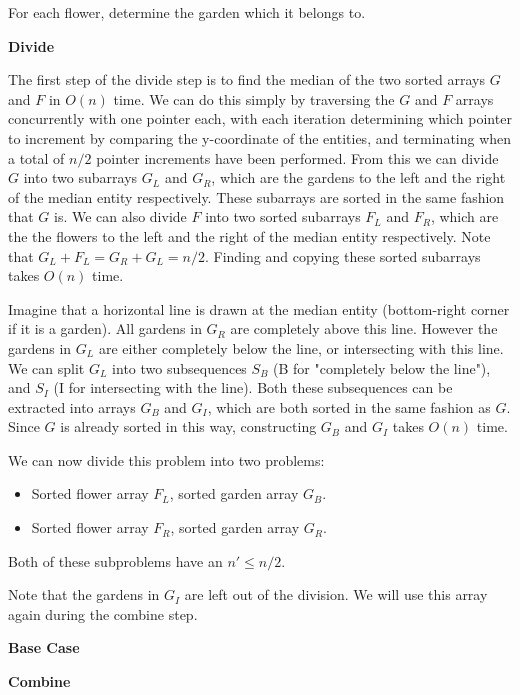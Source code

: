 \documentclass{article}
\begin{document}
\begin{solution}
\begin{enumerate}[label = (\alph*)]
    For each flower, determine the garden which it belongs to.

    \pagebreak

    \textbf{Divide}

    The first step of the divide step is to find the median of the two sorted arrays $G$ and $F$ in $O(n)$ time.
    We can do this simply by traversing the $G$ and $F$ arrays concurrently with one pointer each, 
    with each iteration determining which pointer to increment by comparing the y-coordinate of the entities,
    and terminating when a total of $n/2$ pointer increments have been performed. 
    From this we can divide $G$ into two subarrays $G_L$ and $G_R$, which are the gardens to the 
    left and the right of the median entity respectively. These subarrays are sorted in the same fashion that $G$ is.
    We can also divide $F$ into two sorted subarrays $F_L$ and $F_R$, which are the the flowers to the left and the right of the median entity respectively.
    Note that $G_L + F_L = G_R + G_L = n/2$.
    Finding and copying these sorted subarrays takes $O(n)$ time.

    Imagine that a horizontal line is drawn at the median entity (bottom-right corner if it is a garden).
    All gardens in $G_R$ are completely above this line. However the gardens in $G_L$ are either completely below the line, or intersecting with this line.
    We can split $G_L$ into two subsequences $S_B$ (B for "completely below the line"), and $S_I$ (I for intersecting with the line).
    Both these subsequences can be extracted into arrays $G_B$ and $G_I$, which are both sorted in the same fashion as $G$.
    Since $G$ is already sorted in this way, constructing $G_B$ and $G_I$ takes $O(n)$ time.

    We can now divide this problem into two problems:
    \begin{itemize}
        \item Sorted flower array $F_L$, sorted garden array $G_B$.
        \item Sorted flower array $F_R$, sorted garden array $G_R$.
    \end{itemize}
    Both of these subproblems have an $n'\leq n/2$.

    Note that the gardens in $G_I$ are left out of the division. We will use this array again during the combine step.


    \textbf{Base Case}

    \textbf{Combine}


\end{enumerate}
\end{solution}
\end{document}
